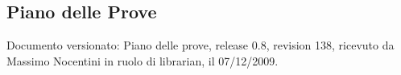 \subsection{Piano delle Prove}
Documento versionato: Piano delle prove, release 0.8, revision 138, ricevuto da
Massimo Nocentini in ruolo di librarian, il 07/12/2009.